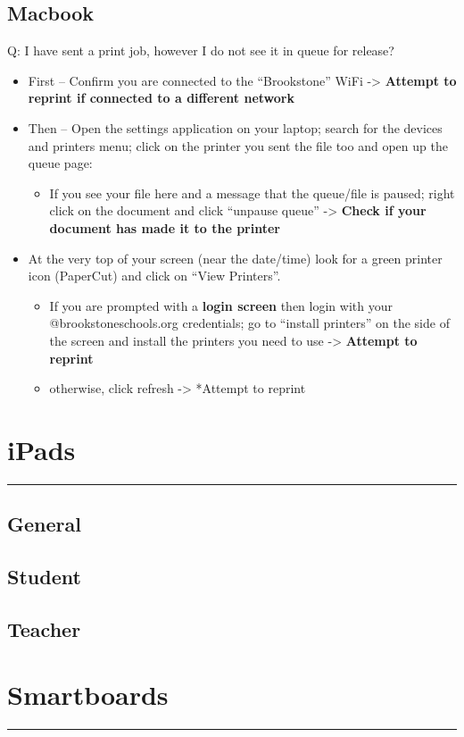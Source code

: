 \documentclass[11pt]{article}
\begin{document}
\subsection{Macbook}
\label{sec:org622590b}
Q: I have sent a print job, however I do not see it in queue for release?
\begin{itemize}
\item First -- Confirm you are connected to the ``Brookstone'' WiFi -> \textbf{Attempt to reprint if connected to a different network}
\item Then -- Open the settings application on your laptop; search for the devices and printers menu; click on the printer you sent the file too and open up the queue page:
\begin{itemize}
\item If you see your file here and a message that the queue/file is paused; right click on the document and click ``unpause queue'' -> \textbf{Check if your document has made it to the printer}
\end{itemize}

\item At the very top of your screen (near the date/time) look for a green printer icon (PaperCut) and click on ``View Printers''.
\begin{itemize}
\item If you are prompted with a \textbf{login screen} then login with your @brookstoneschools.org credentials; go to ``install printers'' on the side of the screen and install the printers you need to use -> \textbf{Attempt to reprint}
\item otherwise, click refresh -> *Attempt to reprint
\end{itemize}
\end{itemize}
\section{iPads}
\label{sec:orgc0bc4d1}
\noindent\rule{\textwidth}{0.5pt}
\subsection{General}
\label{sec:org8eb601b}
\subsection{Student}
\label{sec:org1980b59}
\subsection{Teacher}
\label{sec:org0d97e2a}
\section{Smartboards}
\label{sec:org822c2b5}
\noindent\rule{\textwidth}{0.5pt}
\end{document}
